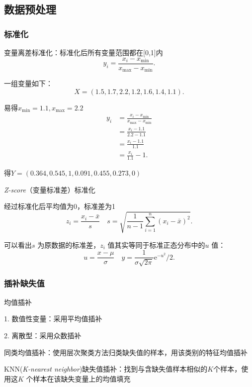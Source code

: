 \subsection{数据预处理}%
\label{sub:数据预处理}
\subsubsection{标准化}%
\label{subsub:标准化}
\begin{notation}
    变量离差标准化：标准化后所有变量范围都在[0,1]内
    \[
        y_{i}=\frac{x_{i}-x_{\min}}{x_{\max}-x_{\min}}
    .\] 
\end{notation}
\begin{eg}
    一组变量如下：
    \[
        X=\left( 1.5,1.7,2.2,1.2,1.6,1.4,1.1 \right) 
    .\] 

    易得$x_{\min}=1.1,x_{\max}=2.2$
    \begin{align*}
        y_{i}&= \frac{x_{i}-x_{\min}}{x_{\max}-x_{\min}}\\
        &= \frac{x_{i}-1.1}{2.2-1.1} \\
        &= \frac{x_{i}-1.1}{1.1} \\
        &= \frac{x_{i}}{1.1}-1
    .\end{align*}

    得$Y=\left( 0.364,0.545,1,0.091,0.455,0.273,0 \right) $
\end{eg}
\begin{notation}
    \textit{Z-score}（变量标准差）标准化

    经过标准化后平均值为0，标准差为1
    \[
        z_i=\frac{x_{i}-\bar{x}}{s} \quad s=\sqrt{\frac{1}{n-1}\sum_{i=1}^{n} \left( x_{i}-\bar{x} \right) ^2} 
    .\] 

    可以看出$s$ 为原数据的标准差，$z_i$ 值其实等同于标准正态分布中的$u$ 值：
    \[
        u=\frac{x-\mu}{\sigma} \quad y=\frac{1}{\sigma\sqrt{2\pi} }\mathrm{e}^{-u^2}/2
    .\] 
\end{notation}
\subsubsection{插补缺失值}%
\label{subsub:插补缺失值}
\begin{notation}
    均值插补

    1. 数值性变量：采用平均值插补

    2. 离散型：采用众数插补
\end{notation}
\begin{notation}
    同类均值插补：使用层次聚类方法归类缺失值的样本，用该类别的特征均值插补
\end{notation}
\begin{notation}
    KNN(\textit{K-nearest neighbor})缺失值插补：找到与含缺失值样本相似的$K$个样本，使用这$K$ 个样本在该缺失变量上的均值填充
\end{notation}


